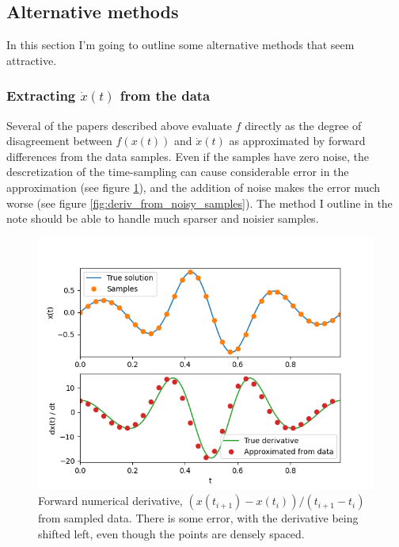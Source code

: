 \documentclass{article}
\begin{document}
\subsection{Alternative methods}

In this section I'm going to outline some alternative methods that seem attractive.

\subsubsection{Extracting $\dot{x}(t)$ from the data}
\label{sec:alternate_extracting_xdot}

Several of the papers described above evaluate $f$ directly as the degree of disagreement between $f(x(t))$ and $\dot{x}(t)$ as approximated by forward differences from the data samples.
Even if the samples have zero noise, the descretization of the time-sampling can cause considerable error in the approximation (see figure \ref{fig:deriv_from_samples}), and the addition of noise makes the error much worse (see figure \ref{fig:deriv_from_noisy_samples}).
The method I outline in the note should be able to handle much sparser and noisier samples.

\begin{figure}
\includegraphics{images/alternative_methods/deriv_from_samples.png}
\centering
\caption{Forward numerical derivative, $\left(x(t_{i+1}) - x(t_i)\right)/\left(t_{i+1} - t_i\right)$ from sampled data. There is some error, with the derivative being shifted left, even though the points are densely spaced.}
\label{fig:deriv_from_samples}
\end{figure}
\end{document}

